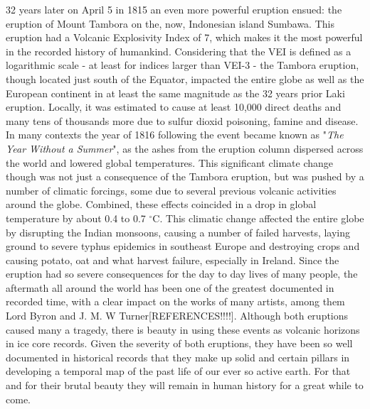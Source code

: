 \documentclass[../../CompleteThesis/Complete_1stDraft]{subfiles}
\begin{document}
	32 years later on April 5 in 1815 an even more powerful eruption ensued: the eruption of Mount Tambora on the, now, Indonesian island Sumbawa. This eruption had a Volcanic Explosivity Index of 7, which makes it the most powerful in the recorded history of humankind. Considering that the VEI is defined as a logarithmic scale - at least for indices larger than VEI-3 - the Tambora eruption, though located just south of the Equator, impacted the entire globe as well as the European continent in at least the same magnitude as the 32 years prior Laki eruption. Locally, it was estimated to cause at least 10,000 direct deaths and many tens of thousands more due to sulfur dioxid poisoning, famine and disease. In many contexts the year of 1816 following the event became known as "\textit{The Year Without a Summer}", as the ashes from the eruption column dispersed across the world and lowered global temperatures. This significant climate change though was not just a consequence of the Tambora eruption, but was pushed by a number of climatic forcings, some due to several previous volcanic activities around the globe. Combined, these effects coincided in a drop in global temperature by about 0.4 to 0.7 $^{\circ}$C. This climatic change affected the entire globe by disrupting the Indian monsoons, causing a number of failed harvests, laying ground to severe typhus epidemics in southeast Europe and destroying crops and causing potato, oat and what harvest failure, especially in Ireland. Since the eruption had so severe consequences for the day to day lives of many people, the aftermath all around the world has been one of the greatest documented in recorded time, with a clear impact on the works of many artists, among them Lord Byron and J. M. W Turner[REFERENCES!!!!]. Although both eruptions caused many a tragedy, there is beauty in using these events as volcanic horizons in ice core records. Given the severity of both eruptions, they have been so well documented in historical records that they make up solid and certain pillars in developing a temporal map of the past life of our ever so active earth. For that and for their brutal beauty they will remain in human history for a great while to come.
	
\end{document}
